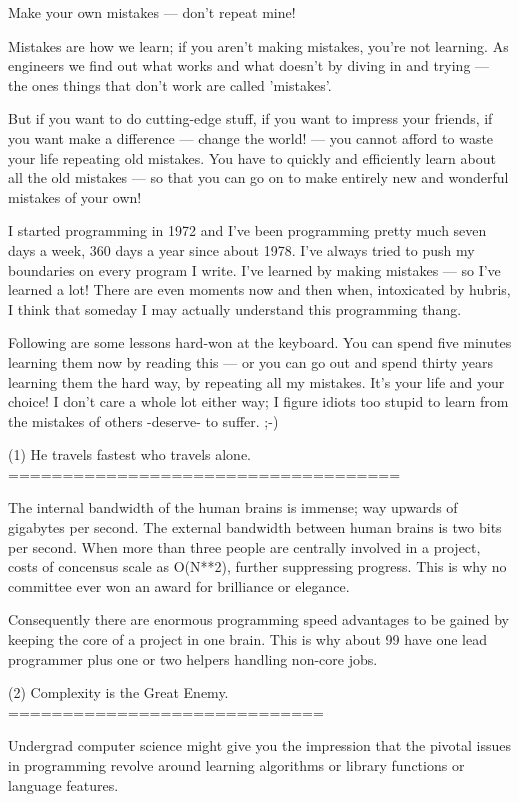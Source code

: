 Make your own mistakes --- don't repeat mine!

Mistakes are how we learn;  if you aren't making mistakes, you're not learning.
As engineers we find out what works and what doesn't by diving in and trying --- 
the ones things that don't work are called 'mistakes'.

But if you want to do cutting-edge stuff, if you want to impress your friends,
if you want make a difference --- change the world! --- you cannot afford to 
waste your life repeating old mistakes.  You have to quickly and efficiently 
learn about all the old mistakes --- so that you can go on to make entirely new 
and wonderful mistakes of your own!

I started programming in 1972 and I've been programming pretty much seven days a week, 
360 days a year since about 1978.  I've always tried to push my boundaries on every 
program I write.  I've learned by making mistakes --- so I've learned a lot!  There 
are even moments now and then when, intoxicated by hubris, I think that someday I may 
actually understand this programming thang.

Following are some lessons hard-won at the keyboard.  You can spend five minutes 
learning them now by reading this --- or you can go out and spend thirty years learning 
them the hard way, by repeating all my mistakes.  It's your life and your choice!  I 
don't care a whole lot either way;  I figure idiots too stupid to learn from the mistakes 
of others -deserve- to suffer. ;-)


(1) He travels fastest who travels alone.
    ====================================

    The internal bandwidth of the human brains is immense; way upwards of gigabytes 
    per second.  The external bandwidth between human brains is two bits per second. 
    When more than three people are centrally involved in a project, costs of concensus 
    scale as O(N**2), further suppressing progress.  This is why no committee ever 
    won an award for brilliance or elegance. 

    Consequently there are enormous programming speed advantages to be gained by keeping 
    the core of a project in one brain.  This is why about 99%
    have one lead programmer plus one or two helpers handling non-core jobs. 


(2) Complexity is the Great Enemy. 
    ============================= 

    Undergrad computer science might give you the impression that the pivotal issues 
    in programming revolve around learning algorithms or library functions or language 
    features. 

